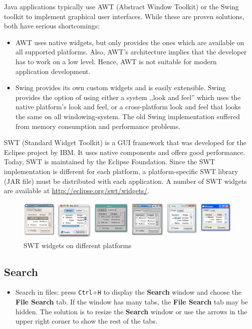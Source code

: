 \documentclass[]{report}
\let\Oldincludegraphics\includegraphics
\renewcommand{\includegraphics}[1]{
\begin{adjustbox}{max size={\textwidth}{\textheight}}
    \Oldincludegraphics[scale=0.6]{#1}%
\end{adjustbox}
}
\begin{document}
Java applications typically use AWT (Abstract Window Toolkit) or the
Swing toolkit to implement graphical user interfaces. While these are
proven solutions, both have serious shortcomings:

\begin{itemize}
\itemsep1pt\parskip0pt
\item
  AWT uses native widgets, but only provides the ones which are
  available on all supported platforms. Also, AWT's architecture implies
  that the developer has to work on a low level. Hence, AWT is not
  suitable for modern application development.
\item
  Swing provides its own custom widgets and is easily extensible. Swing
  provides the option of using either a system ,,look and feel'' which
  uses the native platform's look and feel, or a cross-platform look and
  feel that looks the same on all windowing-system. The old Swing
  implementation suffered from memory consumption and performance
  problems.
\end{itemize}

SWT (Standard Widget Toolkit) is a GUI framework that was developed for
the Eclipse project by IBM. It uses native components and offers good
performance. Today, SWT is maintained by the Eclipse Foundation. Since
the SWT implementation is different for each platform, a
platform-specific SWT library (JAR file) must be distributed with each
application. A number of SWT widgets are available at
\url{http://eclipse.org/swt/widgets/}.

\begin{figure}[htbp]
\centering
\includegraphics{img/eclipse_basics/swt.png}
\caption{SWT widgets on different platforms}
\end{figure}

\subsection{Search}

\begin{itemize}
\itemsep1pt\parskip0pt
\item
  Search in files: press \texttt{Ctrl}+\texttt{H} to display the
  \textbf{Search} window and choose the \textbf{File Search} tab. If the
  window has many tabs, the \textbf{File Search} tab may be hidden. The
  solution is to resize the \textbf{Search} window or use the arrows in
  the upper right corner to show the rest of the tabs.
\end{itemize}
\end{document}
